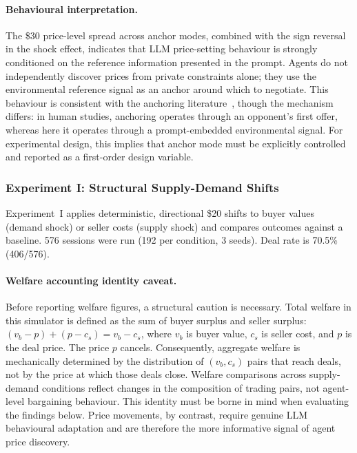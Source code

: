 \paragraph{Behavioural interpretation.}
The \$30 price-level spread across anchor modes, combined with the sign reversal in the shock effect, indicates that LLM price-setting behaviour is strongly conditioned on the reference information presented in the prompt.  Agents do not independently discover prices from private constraints alone; they use the environmental reference signal as an anchor around which to negotiate.  This behaviour is consistent with the anchoring literature~\cite{tversky1974,galinsky2001}, though the mechanism differs: in human studies, anchoring operates through an opponent's first offer, whereas here it operates through a prompt-embedded environmental signal.  For experimental design, this implies that anchor mode must be explicitly controlled and reported as a first-order design variable.

\subsubsection{Experiment I: Structural Supply-Demand Shifts}
\label{sec:results-supply-demand}

Experiment~I applies deterministic, directional \$20 shifts to buyer values (demand shock) or seller costs (supply shock) and compares outcomes against a baseline.  576 sessions were run (192 per condition, 3 seeds).  Deal rate is 70.5\% (406/576).

\paragraph{Welfare accounting identity caveat.}
Before reporting welfare figures, a structural caution is necessary.  Total welfare in this simulator is defined as the sum of buyer surplus and seller surplus: $(v_b - p) + (p - c_s) = v_b - c_s$, where $v_b$ is buyer value, $c_s$ is seller cost, and $p$ is the deal price.  The price $p$ cancels.  Consequently, aggregate welfare is mechanically determined by the distribution of $(v_b, c_s)$ pairs that reach deals, not by the price at which those deals close.  Welfare comparisons across supply-demand conditions reflect changes in the composition of trading pairs, not agent-level bargaining behaviour.  This identity must be borne in mind when evaluating the findings below.  Price movements, by contrast, require genuine LLM behavioural adaptation and are therefore the more informative signal of agent price discovery.

